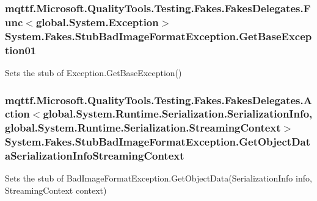 \hypertarget{class_system_1_1_fakes_1_1_stub_bad_image_format_exception_aee11b9a9bfe13113f82c2af177192215}{
\subsubsection[{Get\-Base\-Exception01}]{\setlength{\rightskip}{0pt plus 5cm}mqttf.\-Microsoft.\-Quality\-Tools.\-Testing.\-Fakes.\-Fakes\-Delegates.\-Func$<$global.\-System.\-Exception$>$ System.\-Fakes.\-Stub\-Bad\-Image\-Format\-Exception.\-Get\-Base\-Exception01}}\label{class_system_1_1_fakes_1_1_stub_bad_image_format_exception_aee11b9a9bfe13113f82c2af177192215}


Sets the stub of Exception.\-Get\-Base\-Exception()

\hypertarget{class_system_1_1_fakes_1_1_stub_bad_image_format_exception_aca7423eb410c52dda2552e2ae8e2dc1e}{
\subsubsection[{Get\-Object\-Data\-Serialization\-Info\-Streaming\-Context}]{\setlength{\rightskip}{0pt plus 5cm}mqttf.\-Microsoft.\-Quality\-Tools.\-Testing.\-Fakes.\-Fakes\-Delegates.\-Action$<$global.\-System.\-Runtime.\-Serialization.\-Serialization\-Info, global.\-System.\-Runtime.\-Serialization.\-Streaming\-Context$>$ System.\-Fakes.\-Stub\-Bad\-Image\-Format\-Exception.\-Get\-Object\-Data\-Serialization\-Info\-Streaming\-Context}}\label{class_system_1_1_fakes_1_1_stub_bad_image_format_exception_aca7423eb410c52dda2552e2ae8e2dc1e}


Sets the stub of Bad\-Image\-Format\-Exception.\-Get\-Object\-Data(\-Serialization\-Info info, Streaming\-Context context)

